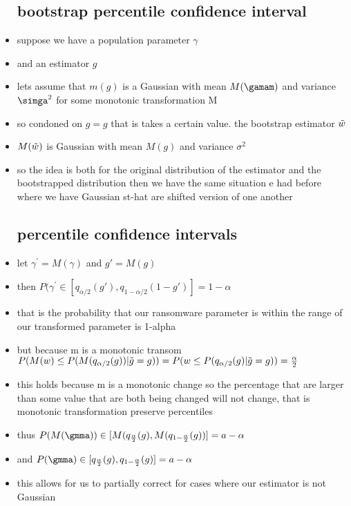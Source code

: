 \documentclass{article}
\begin{document}
\begin{itemize}
\subsection{bootstrap percentile confidence interval}
\item suppose we have a population parameter $\gamma$
\item and an estimator $g$
\item lets assume that $m(g)$ is a Gaussian with mean $M(\gamam)$ and variance $\simga^2$ for some monotonic transformation M 
\item so condoned on $g=g$ that is takes a certain value. the bootstrap estimator $\Tilde{w}$
\item $M(\Tilde{w})$ is Gaussian with mean $M(g)$ and variance $\sigma^2$
\item so the idea is both for the original distribution of the estimator and the bootstrapped distribution then we have the same situation e had before where we have Gaussian st-hat are shifted version of one another 
\subsection{percentile confidence intervals}
\item let $\gamma^{'}=M(\gamma)$ and $g'=M(g)$
\item then $P(\gamma^'\in[q_{\alpha/2}(g'),q_{1-\alpha/2}(1-g')]=1-\alpha$
\item that is the probability that our ransomware parameter is within the range of our transformed parameter is 1-alpha 
\item but because m is a monotonic transom $P(M(w)\leq P(M(q_{\alpha/2}(g))|\Tilde{g}=g))=P(w\leq P(q_{\alpha/2}(g)|\Tilde{g}=g))=\frac{\alpha}{2}$
\item this holds because m is a monotonic change so the percentage that are larger than some value that are both being changed will not change, that is monotonic transformation preserve percentiles 
\item thus $P(M(\gmma))\in [M(q_{\frac{\alpha}{2}}(g),M(q_{1-\frac{\alpha}{2}}(g))]=a-\alpha$
\item and $P(\gmma)\in [q_{\frac{\alpha}{2}}(g),q_{1-\frac{\alpha}{2}}(g)]=a-\alpha$
\item this allows for us to partially correct for cases where our estimator is not Gaussian
\end{itemize}
\end{document}
